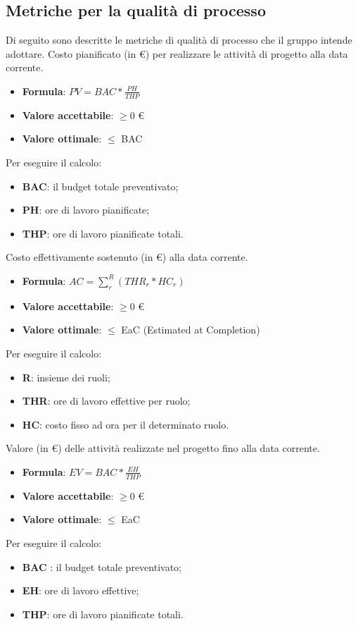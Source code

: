 \subsection{Metriche per la qualità di processo}
Di seguito sono descritte le metriche di qualità di processo che il gruppo intende adottare.
Costo pianificato (in \euro) per realizzare le attività di progetto alla data corrente.
\begin{itemize}
    \item \textbf{Formula}: $PV = BAC * \frac{PH}{THP}$
    \item \textbf{Valore accettabile}: $\geq0$ \euro
    \item \textbf{Valore ottimale}: $\leq$ BAC
\end{itemize}  
Per eseguire il calcolo:
\begin{itemize}
    \item \textbf{BAC}: il budget totale preventivato;
    \item \textbf{PH}: ore di lavoro pianificate;
    \item \textbf{THP}: ore di lavoro pianificate totali.
\end{itemize}

Costo effettivamente sostenuto (in \euro) alla data corrente. 
\begin{itemize}
    \item \textbf{Formula}: $AC = \sum_{r}^{R}(THR_r*HC_r)$
    \item \textbf{Valore accettabile}: $\geq0$ \euro
    \item \textbf{Valore ottimale}: $\leq$ EaC (Estimated at Completion)
\end{itemize}  
Per eseguire il calcolo:
\begin{itemize}
    \item \textbf{R}: insieme dei ruoli;
    \item \textbf{THR}: ore di lavoro effettive per ruolo;
    \item \textbf{HC}: costo fisso ad ora per il determinato ruolo.
\end{itemize}

Valore (in \euro) delle attività realizzate nel progetto fino alla data corrente. 
\begin{itemize}
    \item \textbf{Formula}: $EV=BAC*\frac{EH}{THP}$
    \item \textbf{Valore accettabile}: $\geq0$ \euro
    \item \textbf{Valore ottimale}: $\leq$ EaC
\end{itemize}  
Per eseguire il calcolo:
\begin{itemize}
    \item \textbf{BAC} : il budget totale preventivato;
    \item \textbf{EH}: ore di lavoro effettive;
    \item \textbf{THP}: ore di lavoro pianificate totali.
\end{itemize}

